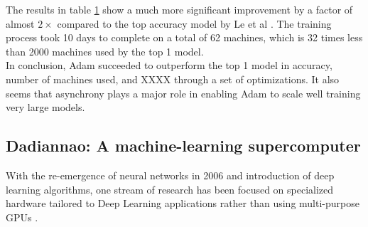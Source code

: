 \documentclass[runningheads,a4paper]{llncs}
\begin{document}
{\begin{table}
\begin{tabular}{ |p{5cm}|p{2cm}|  }
		\hline
		
	\end{tabular}
	\label{table:ImageNet}
\end{table}

The results in table \ref{table:ImageNet} show a much more significant improvement by a factor of almost $2\times$ compared to the top accuracy model by Le et al \cite{le2013building}. The training process took 10 days to complete on a total of 62 machines, which is 32 times less than 2000 machines used by the top 1 model.\\

In conclusion, Adam succeeded to outperform the top 1 model in accuracy, number of machines used, and XXXX through a set of optimizations. It also seems that asynchrony plays a major role in enabling Adam to scale well training very large models.




\subsection*{Dadiannao: A machine-learning supercomputer \cite{chen2014dadiannao}}
With the re-emergence of neural networks in 2006 and introduction of deep learning algorithms, one stream of research has been focused on specialized hardware tailored to Deep Learning applications rather than using multi-purpose GPUs \cite{temam2012defect}\cite{esmaeilzadeh2012neural}.\\

}
\end{document}
